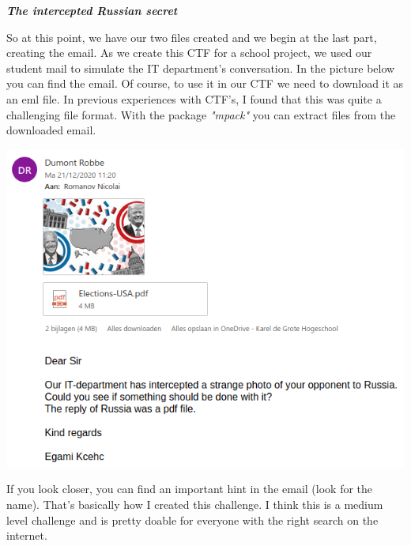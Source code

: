 \documentclass[../main.tex]{subfiles}
\begin{document}
\textbf{\textit{The intercepted Russian secret}}

So at this point, we have our two files created and we begin at the last part, creating the email. As we create this CTF for a school project, we used our student mail to simulate the IT department's conversation. In the picture below you can find the email. Of course, to use it in our CTF we need to download it as an eml file. In previous experiences with CTF's, I found that this was quite a challenging file format. With the package \textit{"mpack"} you can extract files from the downloaded email. 
\begin{center}
    \includegraphics[width=0.7\linewidth]{images/Robbe/sniffer_5.png}
\end{center}

If you look closer, you can find an important hint in the email (look for the name).
That's basically how I created this challenge. I think this is a medium level challenge and is pretty doable for everyone with the right search on the internet.

\pagebreak
\end{document}
